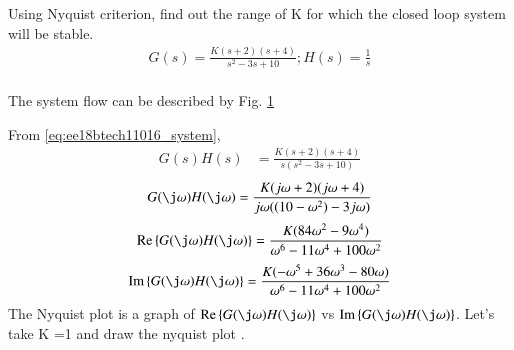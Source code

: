 \item Using Nyquist criterion, find out the range of K for which the closed loop system will be stable.
\begin{align}
\label{eq:ee18btech11016_system}
 G(s)=\frac{K(s+2)(s+4)}{s^2-3s+10} ;  H(s) = \frac{1}{s}  
\end{align}
\\
\solution  The system flow can be described by Fig. \ref{fig:ee18btech11016_figure1}
\begin{figure}[!ht]
    \begin{center}
        \resizebox{\columnwidth}{!}{}
    \end{center}
    \caption{}  
    \label{fig:ee18btech11016_figure1}
\end{figure}
From \eqref{eq:ee18btech11016_system},
%
 \begin{align}
 \label{eq:ee18btech11016_system_equation}
G(s)H(s)&=\frac{K(s+2)(s+4)}{s(s^2-3s+10)}
 \end{align}
 \begin{align}
G(\j \omega)H(\j \omega)=\frac{K(j\omega+2)(j\omega+4)}{j\omega((10-\omega^2)-3j\omega)}
\end{align}
\begin{align}
 \text{Re} \cbrak{G(\j \omega)H(\j \omega)}=\frac{K(84\omega^2 - 9\omega^4)}{\omega^6-11\omega^4+100\omega^2} 
\end{align}
\begin{align}
 \text{Im} \cbrak{G(\j \omega)H(\j \omega)}=\frac{K(-\omega^5 + 36\omega^3-80\omega)}{\omega^6-11\omega^4+100\omega^2} 
\end{align}
%
The Nyquist plot is a graph of $\text{Re} \cbrak{G(\j \omega)H(\j \omega)}$  vs $\text{Im} \cbrak{G(\j \omega)H(\j \omega)}$.
Let's take K =1 and draw the nyquist plot . 
\\

